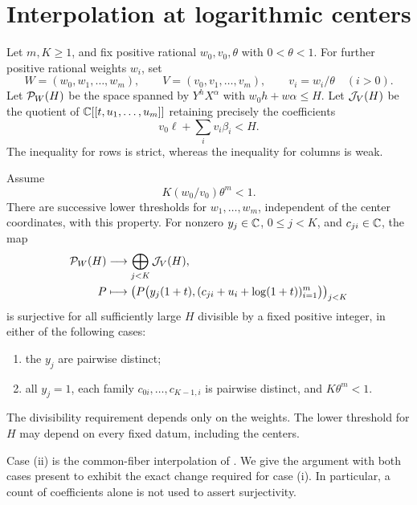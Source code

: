 \section{Interpolation at logarithmic centers}\label{sec:interpolation}

Let \(m,K\ge1\), and fix positive rational \(w_0,v_0,\theta\)
with \(0<\theta<1\). For further positive rational weights \(w_i\),
set
\[
 W=(w_0,w_1,\ldots,w_m),\qquad
 V=(v_0,v_1,\ldots,v_m),\qquad v_i=w_i/\theta\quad(i>0).
\]
Let \(\mathcal P_W(H)\) be the space spanned by \(Y^hX^\alpha\) with
\(w_0h+w\alpha\le H\). Let \(\mathcal J_V(H)\) be the quotient of
\(\mathbb C[[t,u_1,\ldots,u_m]]\) retaining precisely the coefficients
\[
 v_0\ell+\sum_i v_i\beta_i<H.
\]
The inequality for rows is strict, whereas the inequality for columns
is weak.

\begin{theorem}\label{thm:interpolation}
Assume
\begin{equation}\label{eq:volume}
 K(w_0/v_0)\theta^m<1.
\end{equation}
There are successive lower thresholds for \(w_1,\ldots,w_m\),
independent of the center coordinates, with this property.
For nonzero \(y_j\in\mathbb C\), \(0\le j<K\), and \(c_{ji}\in\mathbb C\),
the map
\begin{equation}\label{eq:jetmap}
 \begin{split}
 \mathcal P_W(H)&\longrightarrow\bigoplus_{j<K}\mathcal J_V(H),\\
 P&\longmapsto
 \left(P\bigl(y_j(1+t),
       (c_{ji}+u_i+\log(1+t))_{i=1}^m\bigr)\right)_{j<K}
 \end{split}
\end{equation}
is surjective for all sufficiently large \(H\) divisible by a fixed
positive integer, in either of the following cases:
\begin{enumerate}[label=(\roman*)]
\item the \(y_j\) are pairwise distinct;
\item all \(y_j=1\), each family \(c_{0i},\ldots,c_{K-1,i}\)
is pairwise distinct, and \(K\theta^m<1\).
\end{enumerate}
The divisibility requirement depends only on the weights. The lower
threshold for \(H\) may depend on every fixed datum, including the
centers.
\end{theorem}

Case (ii) is the common-fiber interpolation of \cite[Section 2]{OAIpi}.
We give the argument with both cases present to exhibit the exact
change required for case (i). In particular, a count of coefficients
alone is not used to assert surjectivity.

